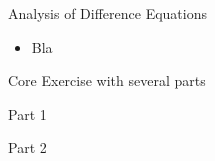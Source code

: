 %
%
%
%
%
%	
%	
%
%
%
%
%	
%
%
%
%
%
%
%
%
%

%
%



\begin{module}{Analysis of Difference Equations}
	\label{diff:analysis}

	
	
\end{module}



\begin{lesson}

	\begin{itemize}
		\item Bla
	\end{itemize}
	

\end{lesson}


\newpage

\question
	Core Exercise with several parts
\begin{parts}
	\item Part 1
	\item Part 2
\end{parts}

